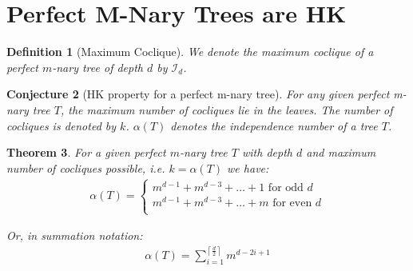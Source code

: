 \documentclass{amsart}
\newtheorem{theorem}{Theorem}[section]
\newtheorem{conjecture}[theorem]{Conjecture}
\newtheorem{definition}[theorem]{Definition}
\theoremstyle{definition}
\begin{document}
\section{Perfect M-Nary Trees are HK}

\begin{definition}[Maximum Coclique]
	We denote the maximum coclique of a perfect $m$-nary tree of depth $d$ by $\mathcal{I}_d$.
\end{definition}

\begin{conjecture}[HK property for a perfect m-nary tree]
	For any given perfect m-nary tree $T$, the maximum number of cocliques lie in the leaves. The number of cocliques is denoted by $k$. $\alpha(T)$ denotes the independence number of a tree $T$.
\end{conjecture}

\begin{theorem}\label{theorem:mnary_independence_num}
	For a given perfect $m$-nary tree $T$ with depth $d$ and maximum number of cocliques possible, i.e. $k = \alpha(T)$ we have:
	\begin{align*}
		\alpha(T) = \begin{cases}
			            m^{d - 1} + m^{d-3} + \ldots + 1 \text{ for odd $d$}  \\
			            m^{d - 1} + m^{d-3} + \ldots + m \text{ for even $d$} \\
		            \end{cases}
	\end{align*}

	Or, in summation notation:
	\begin{align*}
		\alpha(T) = \displaystyle\sum_{i = 1}^{\left\lceil \frac{d}{2} \right\rceil} m^{d - 2i + 1}
	\end{align*}
\end{theorem}
\end{document}
